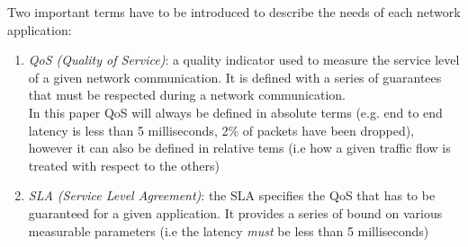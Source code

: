 Two important terms have to be introduced to describe the needs of each network application:
\begin{enumerate}
	\item \textit{QoS (Quality of Service)}: a quality indicator used to measure the service level of a given network communication.  It is defined with a series of guarantees that must be respected during a network communication. \\
	In this paper QoS will always be defined in absolute terms (e.g. end to end latency is less than 5 milliseconds,  2\% of packets have been dropped), however it can also be defined in relative tems (i.e how a given traffic flow is   treated with respect to the others)
	\item \textit{SLA (Service Level Agreement)}: the SLA specifies the QoS that has to be guaranteed for a given application. It provides a series of bound on various measurable parameters (i.e the latency \textit{must} be less than 5 milliseconds)
\end{enumerate}

